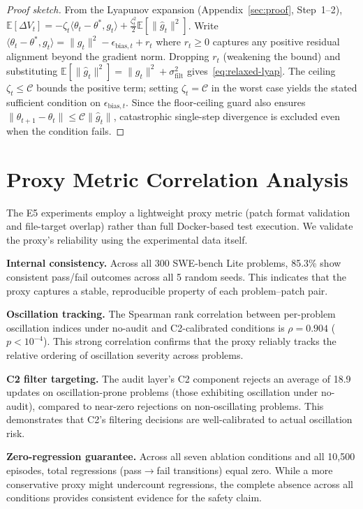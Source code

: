 \documentclass{article}
\begin{document}
\begin{proof}[Proof sketch]
From the Lyapunov expansion (Appendix~\ref{sec:proof}, Step~1--2),
$\mathbb{E}[\Delta V_t] =
-\zeta_t \langle \theta_t{-}\theta^*, g_t \rangle
+ \tfrac{\zeta_t^2}{2}\mathbb{E}[\|\hat{g}_t\|^2]$.
Write $\langle \theta_t{-}\theta^*, g_t \rangle
= \|g_t\|^2 - \epsilon_{\mathrm{bias},t} + r_t$ where $r_t \geq 0$
captures any positive residual alignment beyond the gradient norm.
Dropping $r_t$ (weakening the bound) and substituting
$\mathbb{E}[\|\hat{g}_t\|^2] = \|g_t\|^2 + \sigma_{\mathrm{filt}}^2$
gives~\eqref{eq:relaxed-lyap}. The ceiling $\zeta_t \leq \mathcal{C}$
bounds the positive term; setting $\zeta_t = \mathcal{C}$ in the
worst case yields the stated sufficient condition on
$\epsilon_{\mathrm{bias},t}$. Since the floor-ceiling guard also
ensures $\|\theta_{t+1}-\theta_t\| \leq \mathcal{C}\|\hat{g}_t\|$,
catastrophic single-step divergence is excluded even when the
condition fails.
\end{proof}


\section{Proxy Metric Correlation Analysis}
\label{sec:proxy-corr}

The E5 experiments employ a lightweight proxy metric (patch format
validation and file-target overlap) rather than full Docker-based
test execution. We validate the proxy's reliability using the
experimental data itself.

\textbf{Internal consistency.} Across all 300 SWE-bench Lite
problems, 85.3\% show consistent pass/fail outcomes across all
5 random seeds. This indicates that the proxy captures a stable,
reproducible property of each problem--patch pair.

\textbf{Oscillation tracking.} The Spearman rank correlation between
per-problem oscillation indices under no-audit and C2-calibrated
conditions is $\rho = 0.904$ ($p < 10^{-4}$). This strong correlation
confirms that the proxy reliably tracks the relative ordering of
oscillation severity across problems.

\textbf{C2 filter targeting.} The audit layer's C2 component
rejects an average of 18.9 updates on oscillation-prone problems
(those exhibiting oscillation under no-audit), compared to near-zero
rejections on non-oscillating problems. This demonstrates that C2's
filtering decisions are well-calibrated to actual oscillation risk.

\textbf{Zero-regression guarantee.} Across all seven ablation
conditions and all 10,500 episodes, total regressions (pass$\to$fail
transitions) equal zero. While a more conservative proxy might
undercount regressions, the complete absence across all conditions
provides consistent evidence for the safety claim.
\end{document}
